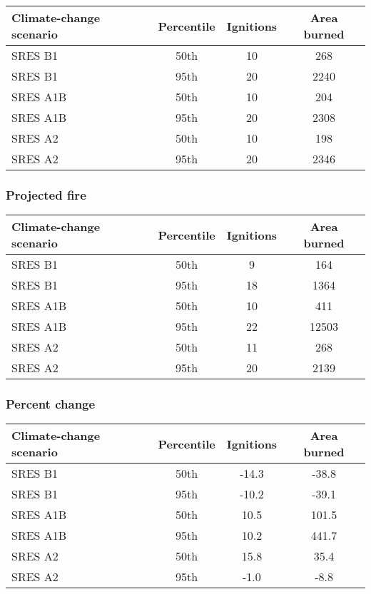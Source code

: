 \documentclass{article}\usepackage[]{graphicx}\usepackage[]{color}
\newcommand{\headcol}{\rowcolor{tableheadcolor}}
\begin{document}
\begin{table}[ht]
\centering
\begin{tabular}{lccc}
  \headcol 
 \toprule
Climate-change scenario & Percentile & Ignitions & Area burned \\ 
  \midrule
SRES B1 & 50th & 10 & 268 \\ 
  SRES B1 & 95th & 20 & 2240 \\ 
  SRES A1B & 50th & 10 & 204 \\ 
  SRES A1B & 95th & 20 & 2308 \\ 
  SRES A2 & 50th & 10 & 198 \\ 
  SRES A2 & 95th & 20 & 2346 \\ 
   \bottomrule
\end{tabular}
\end{table}


\subsubsection{Projected fire}

\begin{table}[ht]
\centering
\begin{tabular}{lccc}
  \headcol 
 \toprule
Climate-change scenario & Percentile & Ignitions & Area burned \\ 
  \midrule
SRES B1 & 50th & 9 & 164 \\ 
  SRES B1 & 95th & 18 & 1364 \\ 
  SRES A1B & 50th & 10 & 411 \\ 
  SRES A1B & 95th & 22 & 12503 \\ 
  SRES A2 & 50th & 11 & 268 \\ 
  SRES A2 & 95th & 20 & 2139 \\ 
   \bottomrule
\end{tabular}
\end{table}


\subsubsection{Percent change}

\begin{table}[ht]
\centering
\begin{tabular}{lccc}
  \headcol 
 \toprule
Climate-change scenario & Percentile & Ignitions & Area burned \\ 
  \midrule
SRES B1 & 50th & -14.3 & -38.8 \\ 
  SRES B1 & 95th & -10.2 & -39.1 \\ 
  SRES A1B & 50th & 10.5 & 101.5 \\ 
  SRES A1B & 95th & 10.2 & 441.7 \\ 
  SRES A2 & 50th & 15.8 & 35.4 \\ 
  SRES A2 & 95th & -1.0 & -8.8 \\ 
   \bottomrule
\end{tabular}
\end{table}
\end{document}

